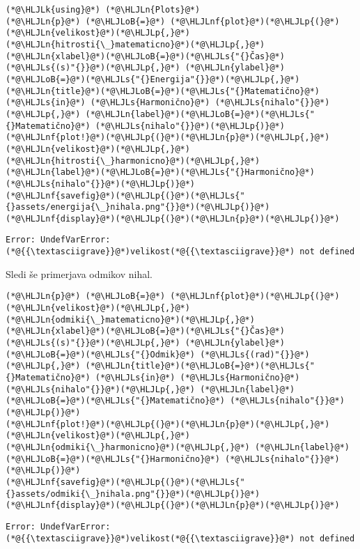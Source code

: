 \documentclass[12pt,a4paper]{article}
\newcommand{\HLJLk}[1]{\textcolor[RGB]{148,91,176}{\textbf{#1}}}
\newcommand{\HLJLn}[1]{#1}
\newcommand{\HLJLnf}[1]{\textcolor[RGB]{66,102,213}{#1}}
\newcommand{\HLJLs}[1]{\textcolor[RGB]{201,61,57}{#1}}
\newcommand{\HLJLoB}[1]{\textcolor[RGB]{102,102,102}{\textbf{#1}}}
\newcommand{\HLJLp}[1]{#1}
\begin{document}
\begin{lstlisting}
(*@\HLJLk{using}@*) (*@\HLJLn{Plots}@*)
(*@\HLJLn{p}@*) (*@\HLJLoB{=}@*) (*@\HLJLnf{plot}@*)(*@\HLJLp{(}@*)(*@\HLJLn{velikost}@*)(*@\HLJLp{,}@*) (*@\HLJLn{hitrosti{\_}matematicno}@*)(*@\HLJLp{,}@*) (*@\HLJLn{xlabel}@*)(*@\HLJLoB{=}@*)(*@\HLJLs{"{}Čas}@*) (*@\HLJLs{(s)"{}}@*)(*@\HLJLp{,}@*) (*@\HLJLn{ylabel}@*)(*@\HLJLoB{=}@*)(*@\HLJLs{"{}Energija"{}}@*)(*@\HLJLp{,}@*) (*@\HLJLn{title}@*)(*@\HLJLoB{=}@*)(*@\HLJLs{"{}Matematično}@*) (*@\HLJLs{in}@*) (*@\HLJLs{Harmonično}@*) (*@\HLJLs{nihalo"{}}@*)(*@\HLJLp{,}@*) (*@\HLJLn{label}@*)(*@\HLJLoB{=}@*)(*@\HLJLs{"{}Matematično}@*) (*@\HLJLs{nihalo"{}}@*)(*@\HLJLp{)}@*)
(*@\HLJLnf{plot!}@*)(*@\HLJLp{(}@*)(*@\HLJLn{p}@*)(*@\HLJLp{,}@*) (*@\HLJLn{velikost}@*)(*@\HLJLp{,}@*) (*@\HLJLn{hitrosti{\_}harmonicno}@*)(*@\HLJLp{,}@*) (*@\HLJLn{label}@*)(*@\HLJLoB{=}@*)(*@\HLJLs{"{}Harmonično}@*) (*@\HLJLs{nihalo"{}}@*)(*@\HLJLp{)}@*)
(*@\HLJLnf{savefig}@*)(*@\HLJLp{(}@*)(*@\HLJLs{"{}assets/energija{\_}nihala.png"{}}@*)(*@\HLJLp{)}@*)
(*@\HLJLnf{display}@*)(*@\HLJLp{(}@*)(*@\HLJLn{p}@*)(*@\HLJLp{)}@*)
\end{lstlisting}

\begin{lstlisting}
Error: UndefVarError: (*@{{\textasciigrave}}@*)velikost(*@{{\textasciigrave}}@*) not defined
\end{lstlisting}


Sledi še primerjava odmikov nihal.


\begin{lstlisting}
(*@\HLJLn{p}@*) (*@\HLJLoB{=}@*) (*@\HLJLnf{plot}@*)(*@\HLJLp{(}@*)(*@\HLJLn{velikost}@*)(*@\HLJLp{,}@*) (*@\HLJLn{odmiki{\_}matematicno}@*)(*@\HLJLp{,}@*) (*@\HLJLn{xlabel}@*)(*@\HLJLoB{=}@*)(*@\HLJLs{"{}Čas}@*) (*@\HLJLs{(s)"{}}@*)(*@\HLJLp{,}@*) (*@\HLJLn{ylabel}@*)(*@\HLJLoB{=}@*)(*@\HLJLs{"{}Odmik}@*) (*@\HLJLs{(rad)"{}}@*)(*@\HLJLp{,}@*) (*@\HLJLn{title}@*)(*@\HLJLoB{=}@*)(*@\HLJLs{"{}Matematično}@*) (*@\HLJLs{in}@*) (*@\HLJLs{Harmonično}@*) (*@\HLJLs{nihalo"{}}@*)(*@\HLJLp{,}@*) (*@\HLJLn{label}@*)(*@\HLJLoB{=}@*)(*@\HLJLs{"{}Matematično}@*) (*@\HLJLs{nihalo"{}}@*)(*@\HLJLp{)}@*)
(*@\HLJLnf{plot!}@*)(*@\HLJLp{(}@*)(*@\HLJLn{p}@*)(*@\HLJLp{,}@*) (*@\HLJLn{velikost}@*)(*@\HLJLp{,}@*) (*@\HLJLn{odmiki{\_}harmonicno}@*)(*@\HLJLp{,}@*) (*@\HLJLn{label}@*)(*@\HLJLoB{=}@*)(*@\HLJLs{"{}Harmonično}@*) (*@\HLJLs{nihalo"{}}@*)(*@\HLJLp{)}@*)
(*@\HLJLnf{savefig}@*)(*@\HLJLp{(}@*)(*@\HLJLs{"{}assets/odmiki{\_}nihala.png"{}}@*)(*@\HLJLp{)}@*)
(*@\HLJLnf{display}@*)(*@\HLJLp{(}@*)(*@\HLJLn{p}@*)(*@\HLJLp{)}@*)
\end{lstlisting}

\begin{lstlisting}
Error: UndefVarError: (*@{{\textasciigrave}}@*)velikost(*@{{\textasciigrave}}@*) not defined
\end{lstlisting}
\end{document}
